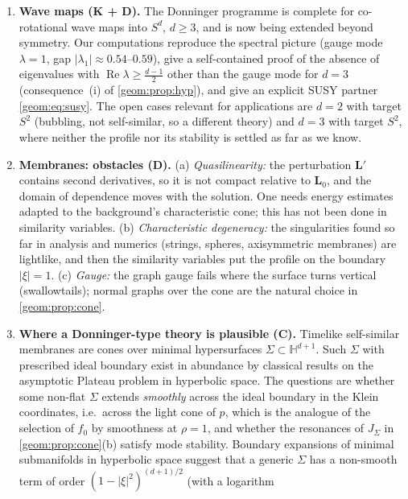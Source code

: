 \begin{enumerate}[leftmargin=*,itemsep=2pt]
\item \textbf{Wave maps (K + D).} The Donninger programme is complete for
  co-rotational wave maps into $S^d$, $d\ge3$, and is now being extended
  beyond symmetry. Our computations reproduce the spectral picture
  (gauge mode $\lambda=1$, gap $|\lambda_1|\approx0.54$--$0.59$), give a
  self-contained proof of the absence of eigenvalues with
  $\operatorname{Re}\lambda\ge\frac{d-1}{2}$ other than the gauge mode for $d=3$
  (consequence~(i) of \cref{geom:prop:hyp}), and give an explicit SUSY partner
  \eqref{geom:eq:susy}. The open cases relevant for applications are $d=2$
  with target $S^2$ (bubbling, not self-similar, so a different theory) and
  $d=3$ with target $S^2$, where neither the profile nor its stability is
  settled as far as we know.
\item \textbf{Membranes: obstacles (D).} (a) \emph{Quasilinearity:} the
  perturbation $\mathbf L'$ contains second derivatives, so it is not compact
  relative to $\mathbf L_0$, and the domain of dependence moves with the
  solution. One needs energy estimates adapted to the background's
  characteristic cone; this has not been done in similarity variables.
  (b) \emph{Characteristic degeneracy:} the singularities found so far in
  analysis and numerics (strings, spheres, axisymmetric membranes) are
  lightlike, and then the
  similarity variables put the profile on the boundary $|\xi|=1$. (c)
  \emph{Gauge:} the graph gauge fails where the surface turns vertical
  (swallowtails); normal graphs over the cone are the natural choice in
  \cref{geom:prop:cone}.
\item \textbf{Where a Donninger-type theory is plausible (C).} Timelike
  self-similar membranes are cones over minimal hypersurfaces
  $\Sigma\subset\mathbb H^{d+1}$. Such $\Sigma$ with prescribed ideal
  boundary exist in abundance by classical results on the asymptotic
  Plateau problem in hyperbolic space.
  The questions are whether some non-flat $\Sigma$ extends
  \emph{smoothly} across the ideal boundary in the Klein coordinates, i.e.\
  across the light cone of $p$, which is the analogue of the selection of
  $f_0$ by smoothness at $\rho=1$, and whether the resonances of $J_\Sigma$
  in \cref{geom:prop:cone}(b) satisfy mode stability. Boundary expansions of
  minimal submanifolds in hyperbolic space suggest that a generic $\Sigma$
  has a non-smooth term of order $(1-|\xi|^2)^{(d+1)/2}$ (with a logarithm

\end{enumerate}
